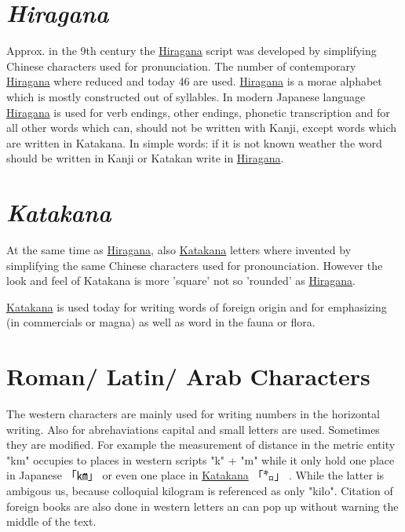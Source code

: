 \section*{\textit{Hiragana}}

Approx. in the 9th century the \hyperref[sec:Hiragana]{Hiragana} script was
developed by simplifying Chinese characters used for pronunciation. The number
of contemporary \hyperref[sec:Hiragana]{Hiragana} where reduced and today 46
are used.  \hyperref[sec:Hiragana]{Hiragana} is a morae alphabet which is
mostly constructed out of syllables. In modern Japanese language
\hyperref[sec:Hiragana]{Hiragana} is used for  verb endings, other endings,
phonetic transcription and for all other words which can, should not be written
with Kanji, except words which are written in Katakana. In simple words: if it
is not known weather the word should be written in Kanji or Katakan write in
\hyperref[sec:Hiragana]{Hiragana}.

\section*{\textit{Katakana}}

At the same time as \hyperref[sec:Hiragana]{Hiragana}, also
\hyperref[sec:Katakana]{Katakana} letters where invented by simplifying the
same Chinese characters used for pronounciation.  However the look and feel of
Katakana is more 'square' not so 'rounded' as
\hyperref[sec:Hiragana]{Hiragana}.

\hyperref[sec:Katakana]{Katakana} is used today for writing words of foreign
origin and for emphasizing (in commercials or magna) as well as word in the
fauna or flora. 

\section*{Roman/ Latin/ Arab Characters}

The western characters are mainly used for writing numbers in the horizontal
writing. Also for abrehaviations capital and small letters are used. Sometimes
they are modified. For example the measurement of distance in the metric entity
"km" occupies to places in western scripts "k" + "m" while it only hold one
place in Japanese {「㎞」} or even one place in
\hyperref[sec:Katakana]{Katakana} {「㌔」} . While the latter is ambigous us,
because colloquial kilogram is referenced
as only "kilo". Citation of foreign books are
also done in western letters an can pop up without warning the middle of the
text.

